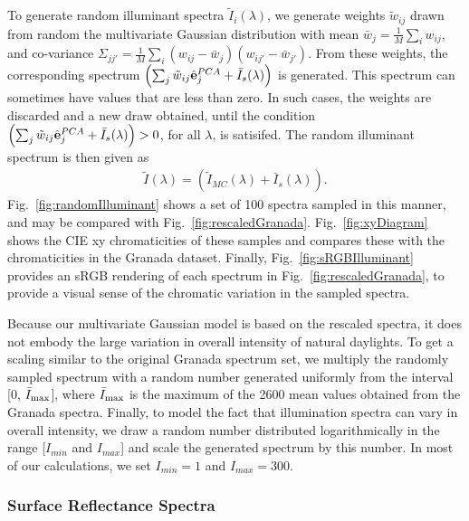 \documentclass{jov}
\begin{document}
To generate random illuminant spectra $\tilde{I}_i(\lambda)$, we generate weights $\tilde{w}_{ij}$ drawn from random 
the multivariate 
Gaussian distribution with mean $\bar{w}_j = \frac{1}{M}\sum_i w_{ij}$, 
and co-variance $\Sigma_{jj'} = \frac{1}{M} \sum_i \left(w_{ij} -\bar{w}_j\right)\left(w_{ij'} -\bar{w}_{j'}\right) $.
From these weights, the corresponding spectrum $\left( \sum_j \tilde{w}_{ij} \hat{{\bf e}}_j^{PCA} +  \bar{I}_{s} (\lambda)\right)$ is generated.
This spectrum can sometimes have values that are less than zero.  In such cases, the weights are discarded and a new draw obtained, until
the condition $\left( \sum_j \tilde{w}_{ij} \hat{{\bf e}}_j^{PCA} +  \bar{I}_{s} (\lambda)\right) > 0$, for all $\lambda$, is satisifed.
The random illuminant spectrum is then given as
\begin{align}
\tilde{I}(\lambda) = \left( \tilde{I}_{MC}(\lambda) + \bar{I}_{s}(\lambda)\right).
\end{align}
Fig.~\ref{fig:randomIlluminant} shows a set of 100 spectra sampled in this manner, and may be compared with Fig.~\ref{fig:rescaledGranada}.  Fig.~\ref{fig:xyDiagram} shows the CIE xy chromaticities of these samples and compares these with the chromaticities in the Granada dataset.  Finally, Fig.~\ref{fig:sRGBIlluminant} provides an sRGB rendering of each spectrum in Fig.~\ref{fig:rescaledGranada}, to provide a visual sense of the chromatic variation in the sampled spectra.

Because our multivariate Gaussian model is based on the rescaled spectra, it does not embody the large variation in overall intensity of natural daylights.
To get a scaling similar to the original Granada spectrum set, we multiply the randomly sampled spectrum with a random number generated uniformly from the interval [0, $\bar{I}_{\rm max}$], where $\bar{I}_{\rm max}$ is the maximum of the 2600 mean values obtained from the Granada spectra. Finally, to model the fact that illumination spectra can vary in overall intensity, we draw a random number distributed logarithmically in the range [$I_{min}$ and $I_{max}$] and scale the generated spectrum by this number.
In most of our calculations, we set $I_{min} = 1$ and $I_{max} = 300$.

\subsubsection{Surface Reflectance Spectra}
\end{document}
